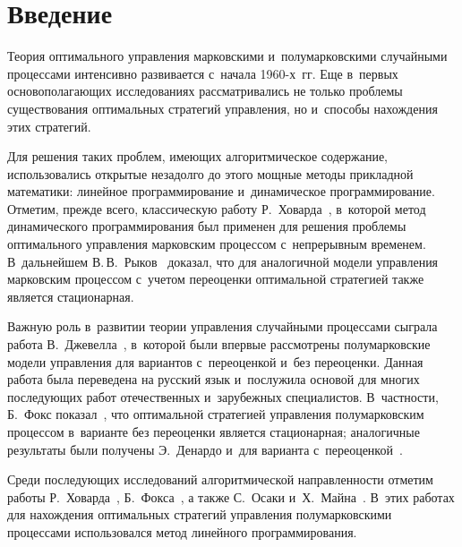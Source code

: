 

\vspace*{9pt}



\thispagestyle{headings}

\begin{multicols}{2}

\label{st\stat}

\section{Введение}

Теория оптимального управления марковскими и~полумарковскими случайными 
процессами интенсивно развивается с~начала 1960-х~гг. Еще в~первых 
основополагающих исследованиях рассматривались не только проблемы существования 
оптимальных стратегий управления, но и~способы нахождения этих стратегий. 

Для решения таких проблем, имеющих алгоритмическое содержание, использовались 
открытые незадолго до этого мощные методы прикладной математики: линейное 
программирование и~динамическое программирование. Отметим, прежде всего, 
классическую работу Р.~Ховарда~\cite{1}, в~которой метод динамического 
программирования был применен для решения проблемы оптимального управления 
марковским процессом с~непрерывным временем. В~дальнейшем В.\,В.~Рыков~\cite{2} 
доказал, что для аналогичной модели управления марковским процессом с~учетом 
переоценки оптимальной стратегией также является стационарная.

Важную роль в~развитии теории управления случайными процессами сыграла работа 
В.~Джевелла~\cite{3}, в~которой были впервые рассмотрены полумарковские модели 
управления для вариантов с~переоценкой и~без переоценки. Данная работа была 
переведена на русский язык и~послужила основой для многих последующих работ 
отечественных и~зарубежных специалистов. В~частности, Б.~Фокс показал~\cite{4}, 
что оптимальной стратегией управления полумарковским процессом в~варианте без 
переоценки является стационарная; аналогичные результаты были получены Э.~Денардо 
и~для варианта с~переоценкой~\cite{5}.

Среди последующих исследований алгоритмической направленности отметим работы 
Р.~Ховарда~\cite{6}, Б.~Фокса~\cite{4}, а также С.~Осаки и~Х.~Майна~\cite{7}. 
В~этих работах для нахождения оптимальных стратегий управления полумарковскими 
процессами использовался метод линейного программирования.


\end{multicols}
